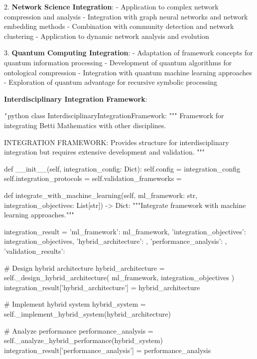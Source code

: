 2. \textbf{Network Science Integration}:
   - Application to complex network compression and analysis
   - Integration with graph neural networks and network embedding methods
   - Combination with community detection and network clustering
   - Application to dynamic network analysis and evolution

3. \textbf{Quantum Computing Integration}:
   - Adaptation of framework concepts for quantum information processing
   - Development of quantum algorithms for ontological compression
   - Integration with quantum machine learning approaches
   - Exploration of quantum advantage for recursive symbolic processing

\textbf{Interdisciplinary Integration Framework}:

\texttt{`}python
class InterdisciplinaryIntegrationFramework:
    """
    Framework for integrating Betti Mathematics with other disciplines.
    
    INTEGRATION FRAMEWORK: Provides structure for interdisciplinary integration
    but requires extensive development and validation.
    """
    
    def __init__(self, integration_config: Dict):
        self.config = integration_config
        self.integration_protocols = {}
        self.validation_frameworks = {}
        
    def integrate_with_machine_learning(self, ml_framework: str, 
                                      integration_objectives: List[str]) -> Dict:
        """Integrate framework with machine learning approaches."""
        
        integration_result = {
            'ml_framework': ml_framework,
            'integration_objectives': integration_objectives,
            'hybrid_architecture': {},
            'performance_analysis': {},
            'validation_results': {}
        }
        
        \# Design hybrid architecture
        hybrid_architecture = self._design_hybrid_architecture(
            ml_framework, integration_objectives
        )
        integration_result['hybrid_architecture'] = hybrid_architecture
        
        \# Implement hybrid system
        hybrid_system = self._implement_hybrid_system(hybrid_architecture)
        
        \# Analyze performance
        performance_analysis = self._analyze_hybrid_performance(hybrid_system)
        integration_result['performance_analysis'] = performance_analysis
        
